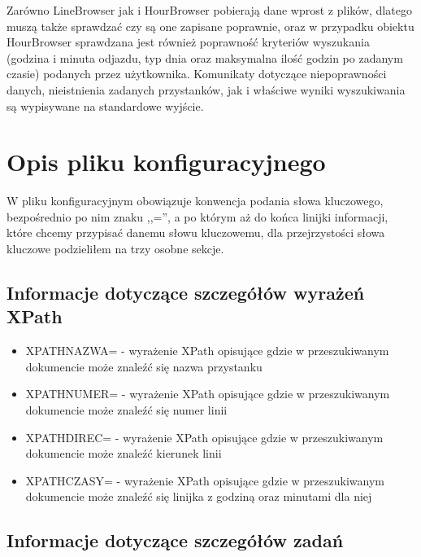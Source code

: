 \documentclass[11pt]{article}
\begin{document}
Zarówno LineBrowser jak i HourBrowser pobierają dane wprost z plików, dlatego muszą także sprawdzać czy są one zapisane poprawnie, oraz w przypadku obiektu HourBrowser sprawdzana jest również poprawność kryteriów wyszukania (godzina i minuta odjazdu, typ dnia oraz maksymalna ilość godzin po zadanym czasie) podanych przez użytkownika. Komunikaty dotyczące niepoprawności danych, nieistnienia zadanych przystanków, jak i właściwe wyniki wyszukiwania są wypisywane na standardowe wyjście.

\section{Opis pliku konfiguracyjnego}

W pliku konfiguracyjnym obowiązuje konwencja podania słowa kluczowego, bezpośrednio po nim znaku ,,='', a po którym aż do końca linijki informacji, które chcemy przypisać danemu słowu kluczowemu, dla przejrzystości słowa kluczowe podzieliłem na trzy osobne sekcje.

\subsection{Informacje dotyczące szczegółów wyrażeń XPath}

\begin{itemize}
\item XPATHNAZWA= - wyrażenie XPath opisujące gdzie w przeszukiwanym dokumencie może znaleźć się nazwa przystanku
\item XPATHNUMER= - wyrażenie XPath opisujące gdzie w przeszukiwanym dokumencie może znaleźć się numer linii
\item XPATHDIREC= - wyrażenie XPath opisujące gdzie w przeszukiwanym dokumencie może znaleźć kierunek linii
\item XPATHCZASY= - wyrażenie XPath opisujące gdzie w przeszukiwanym dokumencie może znaleźć się linijka z godziną oraz minutami dla niej
\end{itemize}

\subsection{Informacje dotyczące szczegółów zadań}
\end{document}
